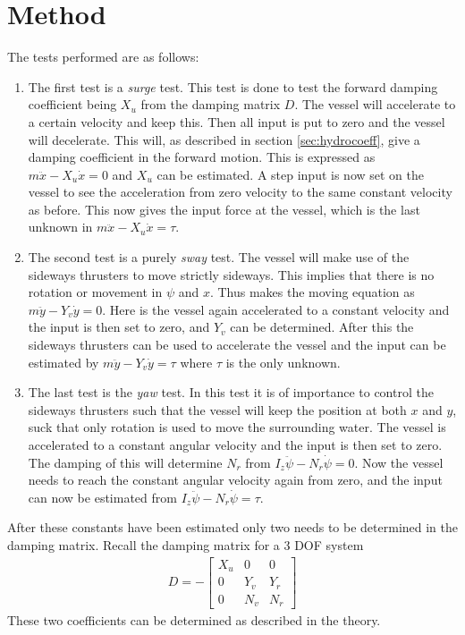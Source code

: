 \section{Method}
The tests performed are as follows:
\begin{enumerate}
	\item The first test is a \textit{surge} test. This test is done to test the forward damping coefficient being $X_u$ from the damping matrix $D$. The vessel will accelerate to a certain velocity and keep this. Then all input is put to zero and the vessel will decelerate. This will, as described in section \ref{sec:hydrocoeff}, give a damping coefficient in the forward motion. This is expressed as $m \ddot x - X_u \dot x = 0$ and $X_u$ can be estimated. A step input is now set on the vessel to see the acceleration from zero velocity to the same constant velocity as before. This now gives the input force at the vessel, which is the last unknown in $m \ddot x - X_u \dot x = \tau$.
	\item The second test is a purely \textit{sway} test. The vessel will make use of the sideways thrusters to move strictly sideways. This implies that there is no rotation or movement in $\psi$ and $x$. Thus makes the moving equation as $m \ddot y - Y_v \dot y = 0$. Here is the vessel again accelerated to a constant velocity and the input is then set to zero, and $Y_v$ can be determined. After this the sideways thrusters can be used to accelerate the vessel and the input can be estimated by $m \ddot y - Y_v \dot y = \tau$ where $\tau$ is the only unknown.
	\item The last test is the \textit{yaw} test. In this test it is of importance to control the sideways thrusters such that the vessel will keep the position at both $x$ and $y$, suck that only rotation is used to move the surrounding water. The vessel is accelerated to a constant angular velocity and the input is then set to zero. The damping of this will determine $N_r$ from $I_z\ddot \psi - N_r \dot \psi = 0$. Now the vessel needs to reach the constant angular velocity again from zero, and the input can now be estimated from $I_z\ddot \psi - N_r \dot \psi = \tau$.
\end{enumerate}
After these constants have been estimated only two needs to be determined in the damping matrix. Recall the damping matrix for a 3 \ac{DOF} system
\begin{align}
D = -
\begin{bmatrix}
X_u & 0 & 0\\
0 & Y_v & Y_r\\
0 & N_v & N_r
\end{bmatrix}
\end{align}
These two coefficients can be determined as described in the theory.


